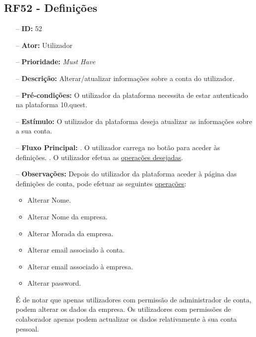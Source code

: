 \subsection{RF52 - Definições}
\begin{itemize}
	\item[--] \textbf{ID:} 52
	\item[--]  \textbf{Ator:} Utilizador
	\item[--]  \textbf{Prioridade:} \textit{Must Have}
	\item[--]  \textbf{Descrição:} Alterar/atualizar informações sobre a conta do utilizador.
	\item[--]  \textbf{Pré-condições:} O utilizador da plataforma necessita de estar autenticado na plataforma 10.quest.
	\item[--]  \textbf{Estímulo:} O utilizador da plataforma deseja atualizar as informações sobre a sua conta.
	\item[--]  \textbf{Fluxo Principal:} 
	. O utilizador carrega no botão para aceder às definições.
	. O utilizador efetua as \underline{operações desejadas}.
	\item[--]  \textbf{Observações:} Depois do utilizador da plataforma aceder à página das definições de conta, pode efetuar as seguintes \underline{operações}:
	\begin{itemize}
		\item Alterar Nome.
		\item Alterar Nome da empresa.
		\item Alterar Morada da empresa.
		\item Alterar email associado à conta.
		\item Alterar email associado à empresa.
		\item Alterar password.
	\end{itemize}
	É de notar que apenas utilizadores com permissão de administrador de conta, podem alterar os dados da empresa. Os utilizadores com permissões de colaborador apenas podem actualizar os dados relativamente à sua conta pessoal.
\end{itemize}
\newpage


